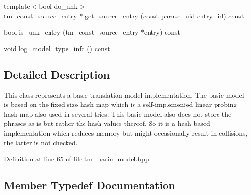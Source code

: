 \begin{DoxyCompactItemize}
\item 
{\footnotesize template$<$bool do\+\_\+unk$>$ }\\\hyperlink{namespaceuva_1_1smt_1_1bpbd_1_1server_1_1tm_1_1models_a86b26049fe9aeb13a850852d897a2a77}{tm\+\_\+const\+\_\+source\+\_\+entry} $\ast$ \hyperlink{classuva_1_1smt_1_1bpbd_1_1server_1_1tm_1_1models_1_1tm__basic__model_af5dc2fd2bdd0ceebcb4926b9edc8f8ef}{get\+\_\+source\+\_\+entry} (const \hyperlink{namespaceuva_1_1smt_1_1bpbd_1_1server_ad18d4cdf5504e76c22b0c124ff60b44f}{phrase\+\_\+uid} entry\+\_\+id) const 
\item 
bool \hyperlink{classuva_1_1smt_1_1bpbd_1_1server_1_1tm_1_1models_1_1tm__basic__model_a1725f9af19bec046005b85cb894b389e}{is\+\_\+unk\+\_\+entry} (\hyperlink{namespaceuva_1_1smt_1_1bpbd_1_1server_1_1tm_1_1models_a86b26049fe9aeb13a850852d897a2a77}{tm\+\_\+const\+\_\+source\+\_\+entry} $\ast$entry) const 
\item 
void \hyperlink{classuva_1_1smt_1_1bpbd_1_1server_1_1tm_1_1models_1_1tm__basic__model_ab87ebccbb4ba343897ea41c3210dd50a}{log\+\_\+model\+\_\+type\+\_\+info} () const 
\end{DoxyCompactItemize}


\subsection{Detailed Description}
This class represents a basic translation model implementation. The basic model is based on the fixed size hash map which is a self-\/implemented linear probing hash map also used in several tries. This basic model also does not store the phrases as is but rather the hash values thereof. So it is a hash based implementation which reduces memory but might occasionally result in collisions, the latter is not checked. 

Definition at line 65 of file tm\+\_\+basic\+\_\+model.\+hpp.



\subsection{Member Typedef Documentation}
\hypertarget{classuva_1_1smt_1_1bpbd_1_1server_1_1tm_1_1models_1_1tm__basic__model_a9891bf54e4dd1e1bef92c662c9b1afab}{}
